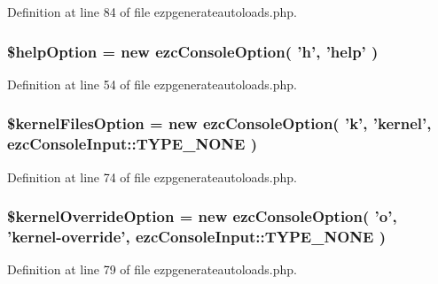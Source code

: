 \-Definition at line 84 of file ezpgenerateautoloads.\-php.

\hypertarget{ezpgenerateautoloads_8php_a785ce4531ef75b21040c99c8cbce7aa4}{
\subsubsection[{\$help\-Option}]{\setlength{\rightskip}{0pt plus 5cm}\$help\-Option = new ezc\-Console\-Option( 'h', 'help' )}}\label{ezpgenerateautoloads_8php_a785ce4531ef75b21040c99c8cbce7aa4}


\-Definition at line 54 of file ezpgenerateautoloads.\-php.

\hypertarget{ezpgenerateautoloads_8php_a7e74e8adf0bd544754962f4ddd4fc35b}{
\subsubsection[{\$kernel\-Files\-Option}]{\setlength{\rightskip}{0pt plus 5cm}\$kernel\-Files\-Option = new ezc\-Console\-Option( 'k', 'kernel', ezc\-Console\-Input\-::\-T\-Y\-P\-E\-\_\-\-N\-O\-N\-E )}}\label{ezpgenerateautoloads_8php_a7e74e8adf0bd544754962f4ddd4fc35b}


\-Definition at line 74 of file ezpgenerateautoloads.\-php.

\hypertarget{ezpgenerateautoloads_8php_a67e31a42e7cb071e5c02df2261d6594a}{
\subsubsection[{\$kernel\-Override\-Option}]{\setlength{\rightskip}{0pt plus 5cm}\$kernel\-Override\-Option = new ezc\-Console\-Option( 'o', 'kernel-\/override', ezc\-Console\-Input\-::\-T\-Y\-P\-E\-\_\-\-N\-O\-N\-E )}}\label{ezpgenerateautoloads_8php_a67e31a42e7cb071e5c02df2261d6594a}


\-Definition at line 79 of file ezpgenerateautoloads.\-php.


